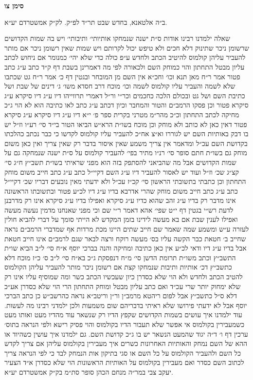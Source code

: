 \documentclass[12pt, openany]{book}
\newcommand{\chapname}{}
\newcommand{\newchap}[1]{
	\addcontentsline{toc}{chapter}{#1}
	\renewcommand{\chapname}{#1}
		\begin{center}
			\textbf{%
\fontsize{16pt}{16pt}\selectfont
				#1}
		\end{center}
}
\begin{document}
\newchap{סימן צו}
\begin{multicols}{2}
ב״ה אלטאנא, בחדש שבט תר״ד לפ״ק. לק״ק אמשטרדם יע״א.\\\vspace{0pt}

שאלה ילמדנו רבינו אודות ס״ת ישנה שנמחקו אותיותי׳ ותיבותי׳ ויש בה שמות הקדושים שרשומן ניכר שתינוק דלא חכים ולא טיפש יכול לקרותם ויש שמות שאין רשומן ניכר אם מותר להעביר עליהן קולמוס להיטיב הכתב ולחדש ע״פ כולה כדי שלא יהי׳ כמנומר אם ניחוש לכתב עליון מבטל התחתון והוי כמוחק השם ולכאורה לפי מה דאמרינן בשבת דף ק״ד כתב ע״ג כתב פטור אמר ר״ח מאן תנא וכו׳ וחכ״א אין השם מן המובחר ובגטין דף כ׳ אמר ר״ח גט שכתבו שלא לשמה והעביר עליו קולמוס לשמה וכו׳ מוכח דרב חסדא משו׳ ג׳ דינים של שבת ושל כתיבת השם ושל גט ובכולם הלכה כחכמים וכר״י ור״ל דאמרי תרווייהו דיו ע״ג דיו סיקרא ע״ג סיקרא פטור וכן פסקו הרמב״ם והטור והמחבר וכיון דכתב ע״ג כתב לאו כתיבה הוא לא הוי ג״כ מחיקה לכתב התחתון וכ״כ מהר״מ מטרני בקרית ספר פ׳ י״א דיו ע״ג דיו סיקרא ע״ג סיקרא פטור דאין כאן לא כותב ולא מוחק וכן מוכח בשו״ת הרא״ש הביאו הטור בי״ד סי׳ רע״ו וז״ל יש בו דבק באותיות השם יש לגוררו וא״צ אח״כ להעביר עליו קולמוס לקדשו כי כבר נכתב כהלכתו בקדושת השם עכ״ל ומדאמר אין צריך משמע שאין איסור בדבר רק שאין צריך ואין כאן משום מוחק גם בשו״ת חתם סופר סי׳ רנ״ו מתיר בפי׳ להעביר קולמוס על ס״ת ישנה שנמחקה גם על שמות הקדושים אבל מה שהביאני להסתפק בזה הוא מפני שראיתי בשו״ת תשב״ץ ח״ג סי׳ קצ״ג שכ׳ וז״ל ועוד יש לאסור להעביר דיו ע״ג השם דקיי״ל כתב ע״ג כתב חייב משום מוחק התחתון וכן כתבתי בתשובתי הראשון סי׳ קכ״ז עכ״ל ולא ידעתי מאין נובעים דבריו שכ׳ דקיי״ל כתב ע״ג כתב חייב משום מוחק שהרי אדרבא בדיו ע״ג דיו לכ״ע פטור ובתשובתו הראשונה אינו מדבר רק בדיו ע״ג זהב שהוא כדיו ע״ג סיקרא ואפילו בדיו ע״ג סיקרא אינו רק מדרבנן לדעת רש״י בגטין דף י״ט שפי׳ אהא דאמר ר״י שם וכי מפני שאנחנו מדמין נעשה מעשה ואפילו לענין שבת אם בא מעשה לידינו בזמן המקדש לא הייתי סומך על דברי להביא חולין לעזרה ע״ש ומשמע שמה שאמר שם חייב שתים היינו מכת מרדות אף שמדברי הרמב״ם נראה שחייב ב׳ חטאת כבר הקשה עליו בס׳ מעשה רוקח ורצה לבאר שגם לרמב״ם אינו חייב חטאת אבל בדיו ע״ג דיו ודאי לכ״ע אין כאן כתיבה ומחיקה והנה בברכי יוסף א״ח סי׳ ל״ב הביא שו״ת התשב״ץ וכתב משו״ת תרומת הדשן סי׳ מ״ח דנפסקת ג״כ בא״ח סי׳ ל״ב ס׳ כ״ז מוכח דלא כתשב״ץ דכ׳ אותיות ותיבות שנמחקו קצת אם רשומן ניכר מותר להעביר עליהן הקולמוס להטיב הכתב ולחדש ולא הוי שלא כסדרן כיון שעכשיו הכתב כשר ומה שמוסיף עליו אינו רק שלא ימחוק יותר שרי עכ״ד ואם כתב עליון מבטל ומוחק התחתון הרי הוי שלא כסדרן אע״כ דלא ס״ל כתשב״ץ אבל לפום ריהטא מרמב״ן ור״ן וריטב״א נראה כהרשב״ש כן כתב הברכי יוסף אבל לא ידעתי פירושו שלא ראיתי בדבריהם שום משמעות ולכן ילמדני רבינו מה לעשות. עוד ילמדנו איך עושים בשמות הקדושים שקפץ הדיו רק שנשאר עוד מהדיו מעט ואותו מעט כשמעבירין בקולמוס אי אפשר שלא תעבור הדיו בקולמוס והוי פסיק רישא ולפי הנראה בתוס׳ ערכין דף ו׳ ד״ה יגוד שהמעט הנשאר יש בו ג״כ קדושת השם. גם ילמדנו איך עושין כשהיוד או ההא של השם נמחק והאותיות האחרונות כשרים איך מעבירין בקולמוס עליהן אם צריך לקדש כל השם ולהעביר הקולמוס על כל השם או סגי בתיקון אות הנמחק לבד כי לפי הנראה צריך לכתוב השם כסדר ואם מעבירין בקולמוס על האותיות הראשונות הוי שלא כסדרן א״ד הצעיר יעקב צבי במר״ה מנחם הכהן סופר סת״מ בק״ק אמשטרדם יע״א.\\\vspace{0pt}


\end{multicols}
\end{document}
